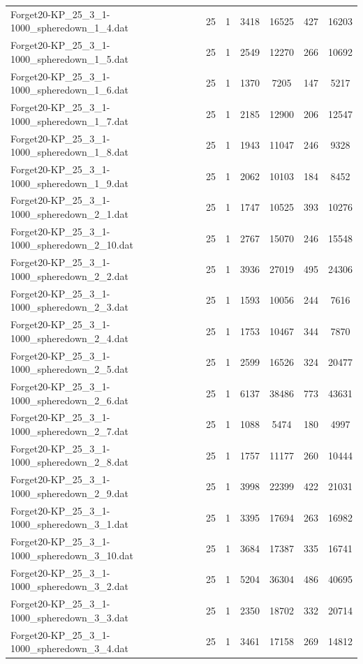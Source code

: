 \begin{table}[!ht]
\begin{tabular}{lcccccc}
Forget20-KP\_25\_3\_1-1000\_spheredown\_1\_4.dat & 25 & 1 & 3418 & 16525 & 427 & 16203 \\
Forget20-KP\_25\_3\_1-1000\_spheredown\_1\_5.dat & 25 & 1 & 2549 & 12270 & 266 & 10692 \\
Forget20-KP\_25\_3\_1-1000\_spheredown\_1\_6.dat & 25 & 1 & 1370 & 7205 & 147 & 5217 \\
Forget20-KP\_25\_3\_1-1000\_spheredown\_1\_7.dat & 25 & 1 & 2185 & 12900 & 206 & 12547 \\
Forget20-KP\_25\_3\_1-1000\_spheredown\_1\_8.dat & 25 & 1 & 1943 & 11047 & 246 & 9328 \\
Forget20-KP\_25\_3\_1-1000\_spheredown\_1\_9.dat & 25 & 1 & 2062 & 10103 & 184 & 8452 \\
Forget20-KP\_25\_3\_1-1000\_spheredown\_2\_1.dat & 25 & 1 & 1747 & 10525 & 393 & 10276 \\
Forget20-KP\_25\_3\_1-1000\_spheredown\_2\_10.dat & 25 & 1 & 2767 & 15070 & 246 & 15548 \\
Forget20-KP\_25\_3\_1-1000\_spheredown\_2\_2.dat & 25 & 1 & 3936 & 27019 & 495 & 24306 \\
Forget20-KP\_25\_3\_1-1000\_spheredown\_2\_3.dat & 25 & 1 & 1593 & 10056 & 244 & 7616 \\
Forget20-KP\_25\_3\_1-1000\_spheredown\_2\_4.dat & 25 & 1 & 1753 & 10467 & 344 & 7870 \\
Forget20-KP\_25\_3\_1-1000\_spheredown\_2\_5.dat & 25 & 1 & 2599 & 16526 & 324 & 20477 \\
Forget20-KP\_25\_3\_1-1000\_spheredown\_2\_6.dat & 25 & 1 & 6137 & 38486 & 773 & 43631 \\
Forget20-KP\_25\_3\_1-1000\_spheredown\_2\_7.dat & 25 & 1 & 1088 & 5474 & 180 & 4997 \\
Forget20-KP\_25\_3\_1-1000\_spheredown\_2\_8.dat & 25 & 1 & 1757 & 11177 & 260 & 10444 \\
Forget20-KP\_25\_3\_1-1000\_spheredown\_2\_9.dat & 25 & 1 & 3998 & 22399 & 422 & 21031 \\
Forget20-KP\_25\_3\_1-1000\_spheredown\_3\_1.dat & 25 & 1 & 3395 & 17694 & 263 & 16982 \\
Forget20-KP\_25\_3\_1-1000\_spheredown\_3\_10.dat & 25 & 1 & 3684 & 17387 & 335 & 16741 \\
Forget20-KP\_25\_3\_1-1000\_spheredown\_3\_2.dat & 25 & 1 & 5204 & 36304 & 486 & 40695 \\
Forget20-KP\_25\_3\_1-1000\_spheredown\_3\_3.dat & 25 & 1 & 2350 & 18702 & 332 & 20714 \\
Forget20-KP\_25\_3\_1-1000\_spheredown\_3\_4.dat & 25 & 1 & 3461 & 17158 & 269 & 14812 \\

\end{tabular}
\end{table}
